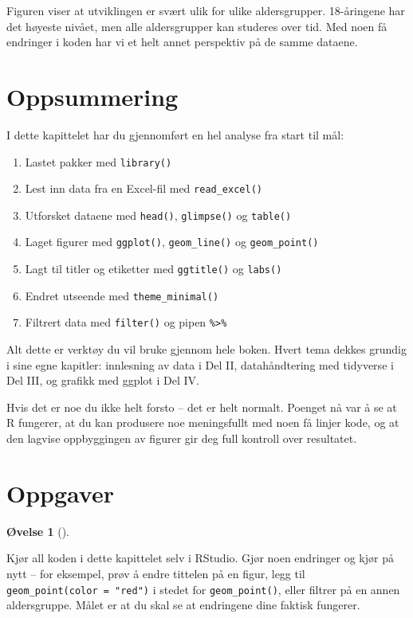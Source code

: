 \documentclass[
  norsk,
  letterpaper,
  DIV=11,
  numbers=noendperiod]{scrreprt}
\providecommand{\tightlist}{%
  \setlength{\itemsep}{0pt}\setlength{\parskip}{0pt}}
\theoremstyle{definition}
\newtheorem{exercise}{Øvelse}[chapter]
\theoremstyle{remark}
\begin{document}
Figuren viser at utviklingen er svært ulik for ulike aldersgrupper.
18-åringene har det høyeste nivået, men alle aldersgrupper kan studeres
over tid. Med noen få endringer i koden har vi et helt annet perspektiv
på de samme dataene.

\section{Oppsummering}\label{oppsummering}

I dette kapittelet har du gjennomført en hel analyse fra start til mål:

\begin{enumerate}
\def\labelenumi{\arabic{enumi}.}
\tightlist
\item
  Lastet pakker med \texttt{library()}
\item
  Lest inn data fra en Excel-fil med \texttt{read\_excel()}
\item
  Utforsket dataene med \texttt{head()}, \texttt{glimpse()} og
  \texttt{table()}
\item
  Laget figurer med \texttt{ggplot()}, \texttt{geom\_line()} og
  \texttt{geom\_point()}
\item
  Lagt til titler og etiketter med \texttt{ggtitle()} og \texttt{labs()}
\item
  Endret utseende med \texttt{theme\_minimal()}
\item
  Filtrert data med \texttt{filter()} og pipen
  \texttt{\%\textgreater{}\%}
\end{enumerate}

Alt dette er verktøy du vil bruke gjennom hele boken. Hvert tema dekkes
grundig i sine egne kapitler: innlesning av data i Del II,
datahåndtering med tidyverse i Del III, og grafikk med ggplot i Del IV.

Hvis det er noe du ikke helt forsto -- det er helt normalt. Poenget nå
var å se at R fungerer, at du kan produsere noe meningsfullt med noen få
linjer kode, og at den lagvise oppbyggingen av figurer gir deg full
kontroll over resultatet.

\section{Oppgaver}\label{oppgaver}

\begin{exercise}[]\protect\hypertarget{exr-forste1}{}\label{exr-forste1}

Kjør all koden i dette kapittelet selv i RStudio. Gjør noen endringer og
kjør på nytt -- for eksempel, prøv å endre tittelen på en figur, legg
til \texttt{geom\_point(color\ =\ "red")} i stedet for
\texttt{geom\_point()}, eller filtrer på en annen aldersgruppe. Målet er
at du skal se at endringene dine faktisk fungerer.

\end{exercise}
\end{document}
